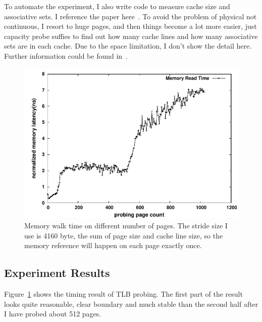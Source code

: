 To automate the experiment, I also write code to measure cache size and
associative sets. I reference the paper here~\cite{sigmetrics:cache}. To avoid
the problem of physical not continuous, I resort to huge pages, and then things
become a lot more easier, just capacity probe suffies to find out how many
cache lines and how many associative sets are in each cache. Due to the space limitation, I don't show the detail here. Further information could be found in~\cite{github}.

\begin{figure}[hpb]
\centering
\includegraphics[width=0.9\linewidth]{../figures/time}
\caption{Memory walk time on different number of pages. The stride size I use is 4160 byte, the sum of page size and cache line size, so the memory reference will happen on each page exactly once.}
\label{fig:tlbsz-time}
\end{figure}

\subsection{Experiment Results}

%
%
%
%
Figure~\ref{fig:tlbsz-time} shows the timing result of TLB probing. The first
part of the result looks quite reasonable, clear boundary and much stable
than the second half after I have probed about 512 pages.

